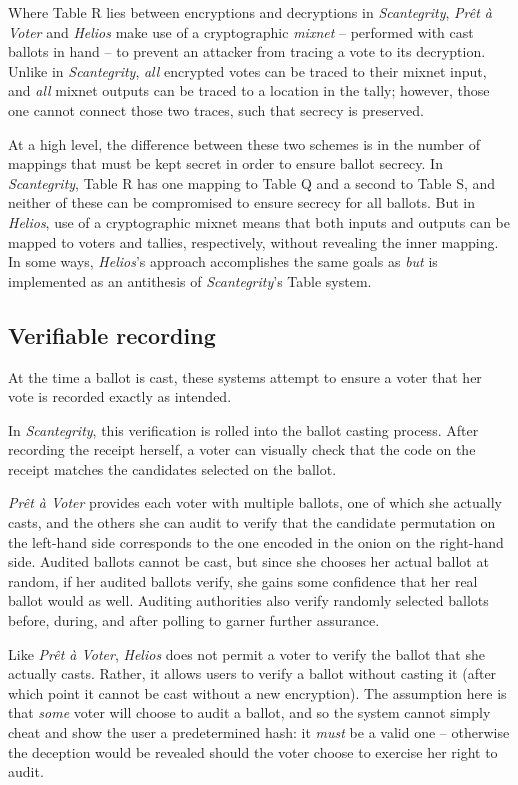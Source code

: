 \documentclass[10pt,twocolumn]{article}
\newcommand{\term}[1]{\textit{#1}}
\newcommand{\preta}{Pr\^{e}t \`{a}}
\newcommand{\pv}{\preta{} Voter}
\begin{document}
Where Table R lies between encryptions and decryptions in \term{Scantegrity}, \term{\pv{}} and \term{Helios} make use of a
cryptographic \term{mixnet} -- performed with cast ballots in hand -- to prevent an attacker from
tracing a vote to its decryption. Unlike in \term{Scantegrity}, \emph{all} encrypted votes can be traced to
their mixnet input, and \emph{all} mixnet outputs can be traced to a location in the tally; however,
those one cannot connect those two traces, such that secrecy is preserved.

At a high level, the difference between these two schemes is in the number of mappings that must be
kept secret in order to ensure ballot secrecy. In \term{Scantegrity}, Table R has one mapping to Table Q
and a second to Table S, and neither of these can be compromised to ensure secrecy for all ballots.
But in \term{Helios}, use of a cryptographic mixnet means that both inputs and outputs can be mapped to
voters and tallies, respectively, without revealing the inner mapping. In some ways, \term{Helios}'s
approach accomplishes the same goals as \emph{but} is implemented as an antithesis of \term{Scantegrity}'s
Table system.

\subsection{Verifiable recording}

At the time a ballot is cast, these systems attempt to ensure a voter that her
vote is recorded exactly as intended.

In \term{Scantegrity}, this verification is rolled into the ballot casting process. After recording the
receipt herself, a voter can visually check that the code on the receipt matches the candidates
selected on the ballot.

\term{\pv{}} provides each voter with multiple ballots, one of which she actually casts, and the others
she can audit to verify that the candidate permutation on the left-hand side corresponds to the one
encoded in the onion on the right-hand side. Audited ballots cannot be cast, but since she chooses
her actual ballot at random, if her audited ballots verify, she gains some confidence that
her real ballot would as well. Auditing authorities also verify randomly selected ballots before,
during, and after polling to garner further assurance.

Like \term{\pv{}}, \term{Helios} does not permit a voter to verify the ballot that she actually casts. Rather, it
allows users to verify a ballot without casting it (after which point it cannot be cast without
a new encryption). The assumption here is that \emph{some} voter will choose to audit a ballot, and
so the system cannot simply cheat and show the user a predetermined hash: it \emph{must} be a valid
one -- otherwise the deception would be revealed should the voter choose to exercise her right
to audit.
\end{document}
